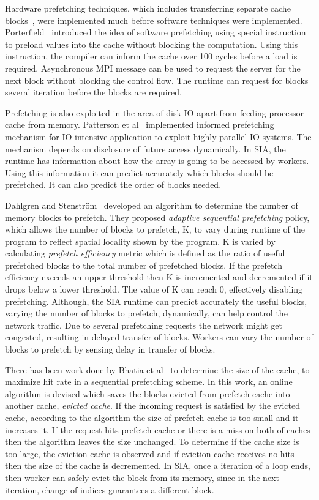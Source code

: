 Hardware prefetching techniques, which includes transferring separate
cache blocks~\cite{Smith1978}, were implemented much before software techniques were
implemented. Porterfield~\cite{Porterfield1989} introduced the idea of software prefetching
using special instruction to preload values into the cache without blocking the
computation. Using this instruction, the compiler can inform the cache over 100
cycles before a load is required. Asynchronous MPI message can be used to request
the server for the next block without blocking the control flow. The runtime can
request for blocks several iteration before the blocks are required.

Prefetching is also exploited in the area of disk IO apart from feeding processor cache
from memory. Patterson et al~\cite{Patterson1994} implemented informed prefetching
mechanism for IO intensive application to exploit highly parallel IO systems. The
mechanism depends on disclosure of future access dynamically. In SIA, the runtime
has information about how the array is going to be accessed by workers. Using this
information it can predict accurately which blocks should be prefetched. It can
also predict the order of blocks needed.

Dahlgren and Stenström~\cite{Dahlgren1993} developed an algorithm to determine the
number of memory blocks to prefetch. They proposed
\textit{adaptive sequential prefetching} policy, which allows the number of blocks
to prefetch, K, to vary during runtime of the program to reflect spatial locality
shown by the program. K is varied by calculating \textit{prefetch efficiency} metric
which is defined as the ratio of useful prefetched blocks to the total number of
prefetched blocks. If the prefetch efficiency exceeds an upper threshold then K is
incremented and decremented if it drops below a lower threshold. The value of K
can reach 0, effectively disabling prefetching. Although, the SIA runtime can
predict accurately the useful blocks, varying the number of blocks to prefetch, dynamically,
can help control the network traffic. Due to several prefetching requests
the network might get congested, resulting in delayed transfer of blocks. Workers
can vary the number of blocks to prefetch by sensing delay in transfer of blocks.

There has been work done by Bhatia et al~\cite{Bhatia2010} to determine the size of
the cache, to maximize hit rate in a sequential prefetching scheme. In this work, an
online algorithm is devised which saves the blocks evicted from prefetch cache
into another cache, \textit{evicted cache}. If the incoming request is satisfied
by the evicted cache, according to the algorithm the size of prefetch cache is too
small and it increases it. If the request hits prefetch cache or there is a miss
on both of caches then the algorithm leaves the size unchanged. To determine if
the cache size is too large, the eviction cache is observed and if eviction cache
receives no hits then the size of the cache is decremented. In SIA, once a
iteration of a loop ends, then worker can safely evict the block from its memory,
since in the next iteration, change of indices guarantees a different block.

